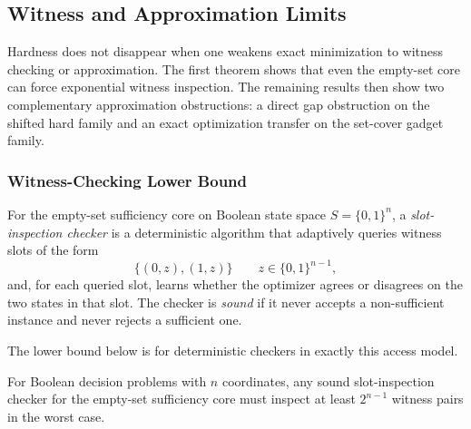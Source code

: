 \subsection{Witness and Approximation Limits}\label{sec:witness-duality}

Hardness does not disappear when one weakens exact minimization to witness checking or approximation. The first theorem shows that even the empty-set core can force exponential witness inspection. The remaining results then show two complementary approximation obstructions: a direct gap obstruction on the shifted hard family and an exact optimization transfer on the set-cover gadget family.

\subsubsection{Witness-Checking Lower Bound}

\begin{definition}
For the empty-set sufficiency core on Boolean state space $S=\{0,1\}^n$, a \emph{slot-inspection checker} is a deterministic algorithm that adaptively queries witness slots of the form
\[
\{(0,z),(1,z)\}\qquad z\in\{0,1\}^{n-1},
\]
and, for each queried slot, learns whether the optimizer agrees or disagrees on the two states in that slot. The checker is \emph{sound} if it never accepts a non-sufficient instance and never rejects a sufficient one.
\end{definition}

The lower bound below is for deterministic checkers in exactly this access model.

\begin{theorem}\label{thm:witness-lower-bound-4}
For Boolean decision problems with $n$ coordinates, any sound slot-inspection checker for the empty-set sufficiency core must inspect at least $2^{n-1}$ witness pairs in the worst case.
\end{theorem}


